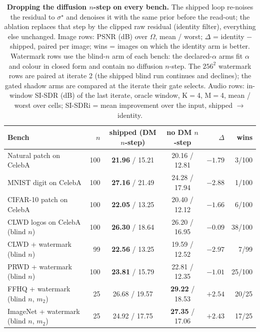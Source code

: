 \begin{table}[t]
    \centering
    \caption{\textbf{Dropping the diffusion $n$-step on every bench.} The shipped loop re-noises the residual to $\sigma^\star$ and denoises it with the same prior before the read-out; the ablation replaces that step by the clipped raw residual (identity filter), everything else unchanged. Image rows: PSNR (dB) over $\Omega$, mean / worst; $\Delta$ = identity $-$ shipped, paired per image; wins = images on which the identity arm is better. Watermark rows use the blind-$n$ arm of each bench: the declared-$\alpha$ arms fit $\alpha$ and colour in closed form and contain no diffusion $n$-step. The $256^2$ watermark rows are paired at iterate 2 (the shipped blind run continues and declines); the gated shadow arms are compared at the iterate their gate selects. Audio rows: in-window SI-SDR (dB) of the last iterate, oracle window, K$=$4, M$=$4, mean / worst over cells; SI-SDRi = mean improvement over the input, shipped $\to$ identity.}
    \label{tab:ablation_nstep}
    \small
    \setlength{\tabcolsep}{4pt}
    \begin{tabular}{@{}lrccrr@{}}
        \toprule
        \textbf{Bench} & $n$ & \textbf{shipped (DM $n$-step)} & \textbf{no DM $n$-step} & $\Delta$ & wins \\
        \midrule
        Natural patch on CelebA & 100 & \textbf{21.96} / 15.21 & 20.16 / 12.81 & $-1.79$ & 3/100 \\
        MNIST digit on CelebA & 100 & \textbf{27.16} / 21.49 & 24.28 / 17.94 & $-2.88$ & 1/100 \\
        CIFAR-10 patch on CelebA & 100 & \textbf{22.05} / 13.25 & 20.40 / 12.12 & $-1.66$ & 6/100 \\
        CLWD logos on CelebA (blind $n$) & 100 & \textbf{26.30} / 18.64 & 26.20 / 16.95 & $-0.09$ & 38/100 \\
        \midrule
        CLWD + watermark (blind $n$) & 99 & \textbf{22.56} / 13.25 & 19.59 / 12.52 & $-2.97$ & 7/99 \\
        PRWD + watermark (blind $n$) & 100 & \textbf{23.81} / 15.79 & 22.81 / 12.35 & $-1.01$ & 25/100 \\
        FFHQ + watermark (blind $n$, $m_2$) & 25 & 26.68 / 19.57 & \textbf{29.22} / 18.53 & $+2.54$ & 20/25 \\
        ImageNet + watermark (blind $n$, $m_2$) & 25 & 24.92 / 17.75 & \textbf{27.35} / 17.06 & $+2.43$ & 17/25 \\

\end{tabular}
\end{table}

